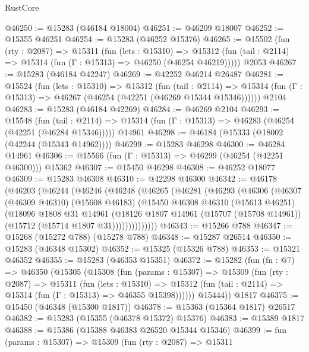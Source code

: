 \begin{lexlean}{RustCore}
\begin{coremodule}
@46250 := @15283 (@46184 @18004)
@46251 := @46209 @18007
@46252 := @15355 @46251
@46254 := @15283 (@46252 @15376)
@46265 := @15502
    (fun (rty : @2087) =>
    @15311
      (fun (lets : @15310) =>
      @15312 (fun (tail : @2114) => @15314 (fun (Γ : @15313) => @46250 (@46254 @46219)))))
    @2053
@46267 := @15283 (@46184 @42247)
@46269 := @42252 @46214 @26487
@46281 := @15524
    (fun (lets : @15310) =>
    @15312
      (fun (tail : @2114) =>
      @15314 (fun (Γ : @15313) => @46267 (@46254 (@42251 (@46269 @15344 @15346))))))
    @2104
@46283 := @15283 (@46184 @42269)
@46284 := @46269 @2104
@46293 := @15548
    (fun (tail : @2114) => @15314 (fun (Γ : @15313) => @46283 (@46254 (@42251 (@46284 @15346)))))
    @14961
@46298 := @46184 (@15333 (@18002 (@42244 (@15343 @14962))))
@46299 := @15283 @46298
@46300 := @46284 @14961
@46306 := @15566 (fun (Γ : @15313) => @46299 (@46254 (@42251 @46300))) @15362
@46307 := @15450 @46298
@46308 := @46252 @18077
@46309 := @15283 @46308
@46310 := @42298 @46300
@46342 := @46178
    (@46203
      (@46244
        (@46246
          (@46248
            (@46265
              (@46281
                (@46293
                  (@46306
                    (@46307
                      (@46309 @46310)
                      (@15608 @46183)
                      (@15450
                        @46308
                        @46310
                        (@15613 @46251)
                        (@18096
                          @1808
                          @31
                          @14961
                          (@18126
                            @1807
                            @14961
                            (@15707 (@15708 @14961))
                            (@15712 (@15714 @1807 @31))))))))))))))
@46343 := @15266 @788
@46347 := @15268 (@15272 @788) (@15278 @788)
@46348 := @15287 @26514
@46350 := @15283 (@46348 @15302)
@46352 := @15325 (@15326 @788)
@46353 := @15321 @46352
@46355 := @15283 (@46353 @15351)
@46372 := @15282
    (fun (fn : @7) =>
    @46350
      (@15305
        (@15308
          (fun (params : @15307) =>
          @15309
            (fun (rty : @2087) =>
            @15311
              (fun (lets : @15310) =>
              @15312 (fun (tail : @2114) => @15314 (fun (Γ : @15313) => @46355 @15398))))))
        @15444))
    @1817
@46375 := @15450 (@46348 (@15300 @1817))
@46378 := @15363 (@15364 @1817) @26517
@46382 := @15283 (@15355 (@46378 @15372) @15376)
@46383 := @15389 @1817
@46388 := @15386 (@15388 @46383 @26520 @15344 @15346)
@46399 := fun (params : @15307) =>
  @15309
    (fun (rty : @2087) =>
    @15311

\end{coremodule}
\end{lexlean}
